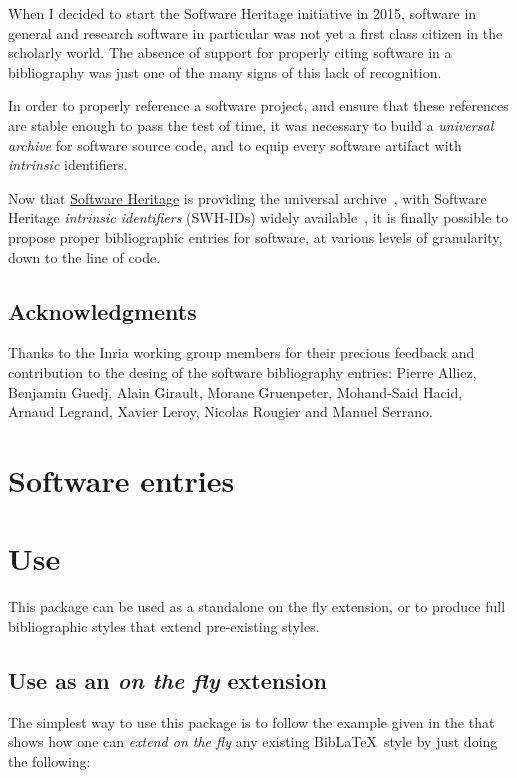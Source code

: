 \documentclass{ltxdockit}
\begin{document}
When I decided to start the Software Heritage initiative in 2015, software in
general and research software in particular was not yet a first class citizen in
the scholarly world. The absence of support for properly citing software in a
bibliography was just one of the many signs of this lack of recognition.

In order to properly reference a software project, and ensure that these
references are stable enough to pass the test of time, it was necessary to build
a \emph{universal archive} for software source code, and to equip every software
artifact with \emph{intrinsic} identifiers.

Now that \href{https://www.softwareheritage.org}{Software Heritage} is providing
the universal archive~\cite{swhcacm2018}, with Software Heritage \emph{intrinsic
  identifiers} (SWH-IDs) widely available~\cite{cise-2020-doi}, it is finally
possible to propose proper bibliographic entries for software, at various levels
of granularity, down to the line of code.

\subsection{Acknowledgments}

Thanks to the Inria working group members for their precious feedback and
contribution to the desing of the software bibliography entries: Pierre Alliez,
Benjamin Guedj, Alain Girault, Morane Gruenpeter, Mohand-Said Hacid, Arnaud
Legrand, Xavier Leroy, Nicolas Rougier and Manuel Serrano.

\section{Software entries}


\section{Use}\label{ref:use}
\label{use}

This package can be used as a standalone on the fly extension, or to produce
full bibliographic styles that extend pre-existing styles.

\subsection{Use as an \emph{on the fly} extension}

The simplest way to use this package is to follow the example given in the
 that shows how one can \emph{extend on the fly} any
existing Bib\LaTeX\ style by just doing the following:
\end{document}
